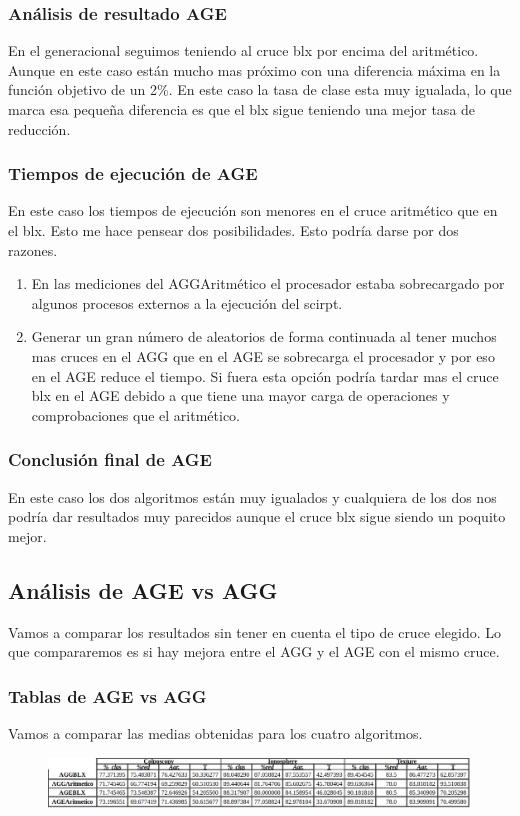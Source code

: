 \documentclass[titlepage]{article}
\begin{document}
	
	\subsubsection{Análisis de resultado AGE}
	En el generacional seguimos teniendo al cruce blx por encima del aritmético. Aunque en este caso están mucho mas próximo con una diferencia máxima en la función objetivo de un 2\%. En este caso la tasa de clase esta muy igualada, lo que marca esa pequeña diferencia es que el blx sigue teniendo una mejor tasa de reducción.
	
	\subsubsection{Tiempos de ejecución de AGE}
	En este caso los tiempos de ejecución son menores en el cruce aritmético que en el blx. Esto me hace pensear dos posibilidades. Esto podría darse por dos razones.
	\begin{enumerate}
		\item En las mediciones del AGGAritmético el procesador estaba sobrecargado por algunos procesos externos a la ejecución del scirpt.
		\item Generar un gran número de aleatorios de forma continuada al tener muchos mas cruces en el AGG que en el AGE se sobrecarga el procesador y por eso en el AGE reduce el tiempo. Si fuera esta opción podría tardar mas el cruce blx en el AGE debido a que tiene una mayor carga de operaciones y comprobaciones que el aritmético. 
	\end{enumerate}
	
	\subsubsection{Conclusión final de AGE}
	En este caso los dos algoritmos están muy igualados y cualquiera de los dos nos podría dar resultados muy parecidos aunque el cruce blx sigue siendo un poquito mejor.
	
	\subsection{Análisis de AGE vs AGG}
	Vamos a comparar los resultados sin tener en cuenta el tipo de cruce elegido. Lo que compararemos es si hay mejora entre el AGG y el AGE con el mismo cruce.
	\subsubsection{Tablas de AGE vs AGG}
	Vamos a comparar las medias obtenidas para los cuatro algoritmos.
	\begin{figure}[H]
		\centering
		\includegraphics[width=1\linewidth]{screenshot008}
		\caption{}
		\label{fig:screenshot008}
	\end{figure}
\end{document}
